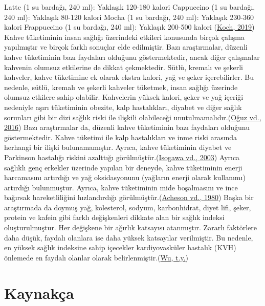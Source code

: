 \documentclass[
  12pt,
]{article}
\begin{document}
Latte (1 su bardağı, 240 ml): Yaklaşık 120-180 kalori
Cappuccino (1 su bardağı, 240 ml): Yaklaşık 80-120 kalori
Mocha (1 su bardağı, 240 ml): Yaklaşık 230-360 kalori
Frappuccino (1 su bardağı, 240 ml): Yaklaşık 200-500 kalori (\protect\hyperlink{ref-koch2019starbucks}{Koch, 2019})
Kahve tüketiminin insan sağlığı üzerindeki etkileri konusunda birçok çalışma yapılmıştır ve birçok farklı sonuçlar elde edilmiştir. Bazı araştırmalar, düzenli kahve tüketiminin bazı faydaları olduğunu göstermektedir, ancak diğer çalışmalar kahvenin olumsuz etkilerine de dikkat çekmektedir.
Sütlü, kremalı ve şekerli kahveler, kahve tüketimine ek olarak ekstra kalori, yağ ve şeker içerebilirler. Bu nedenle, sütlü, kremalı ve şekerli kahveler tüketmek, insan sağlığı üzerinde olumsuz etkilere sahip olabilir. Kahvelerin yüksek kalori, şeker ve yağ içeriği nedeniyle aşırı tüketiminin obezite, kalp hastalıkları, diyabet ve diğer sağlık sorunları gibi bir dizi sağlık riski ile ilişkili olabileceği unutulmamalıdır.(\protect\hyperlink{ref-ouguz2016kahve}{Oğuz vd., 2016})
Bazı araştırmalar da, düzenli kahve tüketiminin bazı faydaları olduğunu göstermektedir. Kahve tüketimi ile kalp hastalıkları ve inme riski arasında herhangi bir ilişki bulunamamıştır. Ayrıca, kahve tüketiminin diyabet ve Parkinson hastalığı riskini azalttığı görülmüştür.(\protect\hyperlink{ref-isogawa2003coffee}{Isogawa vd., 2003}) Ayrıca sağlıklı genç erkekler üzerinde yapılan bir deneyde, kahve tüketiminin enerji harcamasını artırdığı ve yağ oksidasyonunu (yağların enerji olarak kullanımı) artırdığı bulunmuştur. Ayrıca, kahve tüketiminin mide boşalmasını ve ince bağırsak hareketliliğini hızlandırdığı görülmüştür.(\protect\hyperlink{ref-acheson1980caffeine}{Acheson vd., 1980})
Başka bir araştırmada da doymuş yağ, kolesterol, sodyum, karbonhidrat, diyet lifi, şeker, protein ve kafein gibi farklı değişkenleri dikkate alan bir sağlık indeksi oluşturulmuştur. Her değişkene bir ağırlık katsayısı atanmıştır. Zararlı faktörlere daha düşük, faydalı olanlara ise daha yüksek katsayılar verilmiştir. Bu nedenle, en yüksek sağlık indeksine sahip içecekler kardiyovasküler hastalık (KVH) önlemede en faydalı olanlar olarak belirlenmiştir.(\protect\hyperlink{ref-wustarbucks}{Wu, t.y.})

\newpage

\hypertarget{references}{%
\section{Kaynakça}\label{references}}
\end{document}
